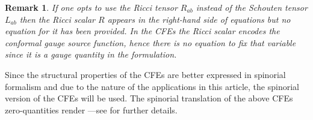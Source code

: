 \documentclass[10pt,a4paper]{article}
\theoremstyle{plain}
\newtheorem{remark}{Remark}
\begin{document}
{ \color{blue}

\begin{remark}
  \emph{ If one opts to use the Ricci tensor $R_{ab}$ instead of the Schouten tensor $L_{ab}$ then
    the Ricci scalar $R$ appears in the right-hand side of
    equations but no equation for it has been provided.
    In the CFEs the Ricci scalar encodes the \emph{conformal gauge source function}, hence
    there is no equation to fix that variable since it is a gauge quantity in the formulation.}
\end{remark}


Since the structural properties of the CFEs are better expressed in
spinorial formalism and due to the nature of the applications in this
article, the spinorial version of the CFEs will be used. The spinorial
 translation of the above CFEs zero-quantities render
---see \cite{CFEbook} for further details.

}
\end{document}
